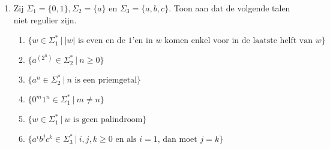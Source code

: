 \documentclass[a4paper]{article}
\begin{document}
\begin{enumerate}
   \item Zij $\Sigma_1 = \{0,1\}, \Sigma_2 = \{a\}$ en $\Sigma_3 = \{a,b,c\}$. Toon aan dat de volgende talen niet regulier zijn.
      \begin{enumerate}
         \item $\{ w \in \Sigma_1^*\ |\ \mbox{$\left|w\right|$ is even en de $1$'en in $w$ komen enkel voor in de laatste helft van $w$}\}$
         \item $\{ a^{\left( 2^n \right) } \in \Sigma_2^* \ | \ n \geq 0 \}$                                      %
         \item $\{ a^n \in \Sigma_2^*\ | \ \mbox{$n$ is een priemgetal} \}$                                       %
         \item $\{ 0^m1^n \in \Sigma_1^* \ | \ m \neq n \}$                                                       %
         \item $\{ w \in \Sigma_1^* \ | \ \mbox{$w$ is geen palindroom} \}$                                       %
         \item $\{ a^ib^jc^k \in \Sigma_3^* \ | \ \mbox{$i,j,k \geq 0$ en als $i = 1$, dan moet $j=k$} \}$        %
      \end{enumerate}
	\end{enumerate}
\end{document}
